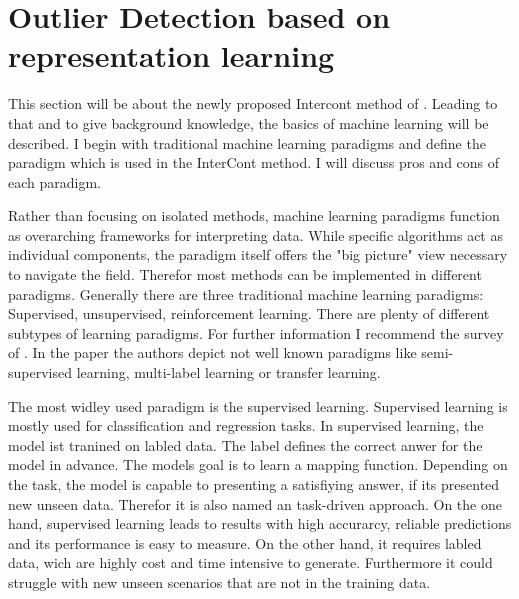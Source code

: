 \section{Outlier Detection based on representation learning}


This section will be about the newly proposed Intercont method of \citep{shenkar2022anomaly}. 
Leading to that and to give background knowledge, the basics of machine learning will be described.
I begin with traditional machine learning paradigms and define the paradigm which is used in the InterCont method.
I will discuss pros and cons of each paradigm.




Rather than focusing on isolated methods, machine learning paradigms function as overarching frameworks for interpreting data. 
While specific algorithms act as individual components, the paradigm itself offers the "big picture" view necessary to navigate the field.
Therefor most methods can be implemented in different paradigms.
Generally there are three traditional machine learning paradigms:
Supervised, unsupervised, reinforcement learning.   
There are plenty of different subtypes of learning paradigms. 
For further information I recommend the survey of \citet{sarker2021machine}.
In the paper the authors depict not well known paradigms like semi-supervised learning, multi-label learning or transfer learning.


The most widley used paradigm is the supervised learning. 
Supervised learning is mostly used for classification and regression tasks.
In supervised learning, the model ist tranined on labled data. 
The label defines the correct anwer for the model in advance.
The models goal is to learn a mapping function.
Depending on the task, the model is capable to presenting a satisfiying answer, if its presented new unseen data.
Therefor it is also named an task-driven approach. \citep[p.3]{sarker2021machine}
On the one hand, supervised learning leads to results with high accurarcy, reliable predictions and its performance is easy to measure.
On the other hand, it requires labled data, wich are highly cost and time intensive to generate.
Furthermore it could struggle with new unseen scenarios that are not in the training data.


